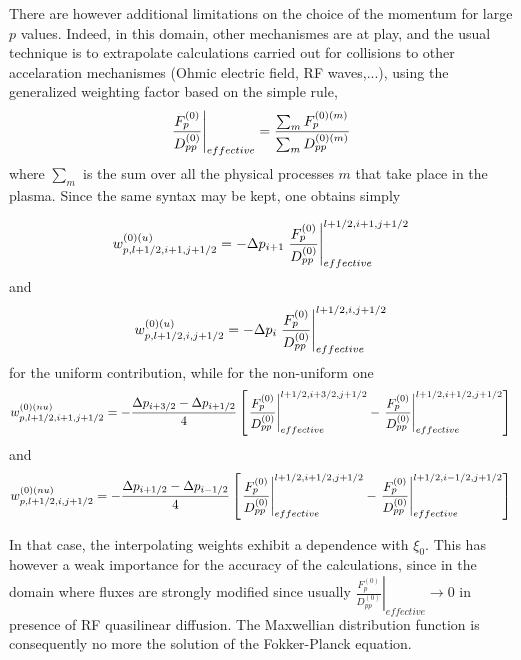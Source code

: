 There are however additional limitations on the choice of the momentum for
large $p$ values. Indeed, in this domain, other mechanismes are at play, and
the usual technique is to extrapolate calculations carried out for
collisions to other accelaration mechanismes (Ohmic electric field, RF
waves,...), using the generalized weighting factor based on the simple rule,
\begin{equation}
\left. \frac{F_{p}^{\left( 0\right) }}{D_{pp}^{\left( 0\right) }}\right|
_{effective}=\frac{\sum_{m}F_{p}^{\left( 0\right) (m)}}{\sum_{m}D_{pp}^{%
\left( 0\right) (m)}}
\end{equation}
where $\sum_{m}$ is the sum over all the physical processes $m$ that take
place in the plasma. Since the same syntax may be kept, one obtains simply

\begin{equation}
w_{p,l+1/2,i+1,j+1/2}^{\left( 0\right) (u)}=-\Delta p_{i+1}\left. \frac{%
F_{p}^{\left( 0\right) }}{D_{pp}^{\left( 0\right) }}\right|
_{effective}^{l+1/2,i+1,j+1/2}
\end{equation}
and
\begin{equation}
w_{p,l+1/2,i,j+1/2}^{\left( 0\right) (u)}=-\Delta p_{i}\left. \frac{%
F_{p}^{\left( 0\right) }}{D_{pp}^{\left( 0\right) }}\right|
_{effective}^{l+1/2,i,j+1/2}
\end{equation}
for the uniform contribution, while for the non-uniform one
\begin{equation}
w_{p,l+1/2,i+1,j+1/2}^{\left( 0\right) (nu)}=-\frac{\Delta p_{i+3/2}-\Delta %
p_{i+1/2}}{4}\left[ \left. \frac{F_{p}^{\left( 0\right) }}{D_{pp}^{\left(
0\right) }}\right| _{effective}^{l+1/2,i+3/2,j+1/2}-\left. \frac{%
F_{p}^{\left( 0\right) }}{D_{pp}^{\left( 0\right) }}\right|
_{effective}^{l+1/2,i+1/2,j+1/2}\right]
\end{equation}
and
\begin{equation}
w_{p,l+1/2,i,j+1/2}^{\left( 0\right) (nu)}=-\frac{\Delta p_{i+1/2}-\Delta %
p_{i-1/2}}{4}\left[ \left. \frac{F_{p}^{\left( 0\right) }}{D_{pp}^{\left(
0\right) }}\right| _{effective}^{l+1/2,i+1/2,j+1/2}-\left. \frac{%
F_{p}^{\left( 0\right) }}{D_{pp}^{\left( 0\right) }}\right|
_{effective}^{l+1/2,i-1/2,j+1/2}\right]
\end{equation}

In that case, the interpolating weights exhibit a dependence with $\xi _{0}.$
This has however a weak importance for the accuracy of the calculations,
since in the domain where fluxes are strongly modified since usually $\left.
\frac{F_{p}^{\left( 0\right) }}{D_{pp}^{\left( 0\right) }}\right|
_{effective}\rightarrow 0$ in presence of RF quasilinear diffusion. The
Maxwellian distribution function is consequently no more the solution of the
Fokker-Planck equation.


